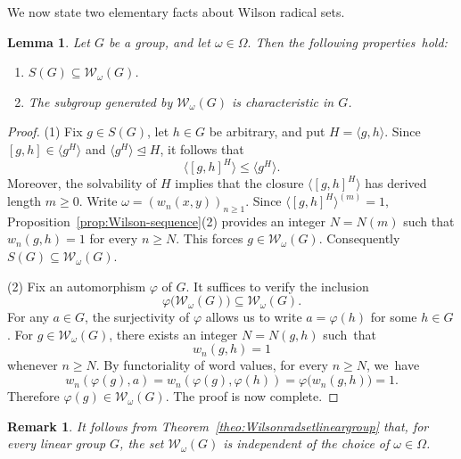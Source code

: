 \documentclass[10pt,a4paper]{amsart}
\numberwithin{equation}{section}
\newtheorem{lemma}[theorem]{Lemma}
\newtheorem{Remark}[theorem]{Remark}
\numberwithin{equation}{section}
\begin{document}
We now state two elementary facts about Wilson radical sets.

\begin{lemma}\label{lem:SsubseteqW}
Let $G$ be a group, and let $\omega\in\Omega.$ Then the following properties~hold:
\begin{enumerate}[label=\textup{(\arabic*)}]
    \item $S(G) \subseteq \mathcal{W}_{\omega}(G)$.
    \item The subgroup generated by $ \mathcal{W}_{\omega}(G)$ is characteristic in $G$.
\end{enumerate}
\end{lemma}
    
\begin{proof} (1) 
Fix $g\in S(G)$, let $h\in G$ be arbitrary, and put $H=\langle g,h\rangle$. 
Since $[g,h]\in\langle g^H\rangle$ and $\langle g^H\rangle\trianglelefteq H$, it follows that
  $$\bigl\langle [g,h]^H\bigr\rangle
  \leq
  \langle g^H\rangle.$$
Moreover, the solvability of $H$ implies that the closure $\bigl\langle [g,h]^H \bigr\rangle$ has derived length $m \geq 0$. 
Write $\omega=(w_n(x,y))_{n\geq 1}$. 
Since   $\bigl\langle [g,h]^H\bigr\rangle^{(m)}=1,$ Proposition~\ref{prop:Wilson-sequence}\textup{(2)} provides an integer $N=N(m)$ such that $w_n(g,h)=1$ for every $n\geq N$. 
This forces $ g \in \mathcal{W}_{\omega}(G) $. 
Consequently  $S(G) \subseteq \mathcal{W}_{\omega}(G).$

    \medskip

        (2) Fix an automorphism $ \varphi $ of $ G $. 
        It suffices to verify the inclusion $$\varphi\bigl(\mathcal{W}_{\omega}(G)\bigr) \subseteq \mathcal{W}_{\omega}(G).$$
 For any $a \in G$, the surjectivity of $\varphi$ allows us to write $a = \varphi(h)$ for some $h \in G$. 
 For $g\in\mathcal W_\omega(G)$, there exists an integer $N=N(g,h)$ such~that
  $$w_n(g,h)=1$$ whenever $n\geq N$.
By functoriality of word values, for every $n\geq N$, we~have $$ w_n(\varphi(g),a) = w_n(\varphi(g),\varphi(h)) = \varphi\bigl(w_n(g,h)\bigr) = 1. $$  
Therefore $\varphi(g)\in\mathcal W_\omega(G)$. The proof is now complete.
\end{proof}

\begin{Remark} \label{rm:24}
It follows from Theorem~\ref{theo:Wilsonradsetlineargroup} that, for every linear group $G$, the set $\mathcal W_\omega(G)$ is independent of the choice of $\omega\in\Omega$.
\end{Remark}
\end{document}
